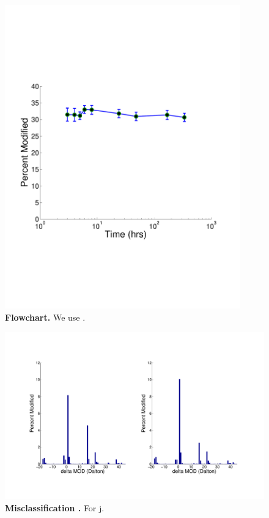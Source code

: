 \documentclass[12pt]{article}
\begin{document}
\begin{figure}[!ht]
\centerline{\includegraphics[width=4in]{Figures/Paper_Ecoli_PTM_Modified_Figure1.pdf}}
\caption{\label{fig:flowchart}\textbf{Flowchart.} We use .
}
\end{figure}

\clearpage
\begin{figure}[!ht]
\centerline{\includegraphics[width=8in]{Figures/PTMdalton.pdf}}
\caption{\label{fig:misclassification}\textbf{Misclassification .} For j.}
\end{figure}
\end{document}
